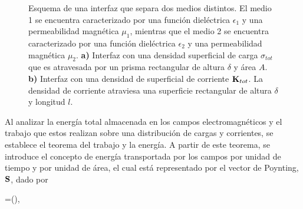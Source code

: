%
\begin{figure}[H]
	\centering
	\caption{Esquema de una interfaz que separa dos medios distintos. El medio 1 se encuentra caracterizado por una función dieléctrica $\epsilon_1$ y una permeabilidad magnética $\mu_1$, mientras que el medio 2 se encuentra caracterizado por una función dieléctrica $\epsilon_2$ y una permeabilidad magnética $\mu_2$. \textbf{a)} Interfaz con una densidad superficial de carga $\sigma_{tot}$ que es atravesada por un prisma rectangular de altura $\delta$ y área $A$. \textbf{b)} Interfaz con una densidad de superficial de corriente $\vb{K}_{tot}$. La densidad de corriente atraviesa una superficie rectangular de altura $\delta$ y longitud $l$.}
	\label{condiciones_frontera}
\end{figure}
%
Al analizar la energía total almacenada en los campos electromagnéticos y el trabajo que estos realizan sobre una distribución de cargas y corrientes, se establece el teorema del trabajo y la energía. A partir de este teorema, se introduce el concepto de energía transportada por los campos por unidad de tiempo y por unidad de área, el cual está representado por el vector de Poynting, $\vb{S}$, dado por \cite{griffithsIntroductionElectrodynamics2023}

\begin{tcolorbox}
	=(\times{}),
	\label{eq:vect_Poynting} 
\end{tcolorbox}
